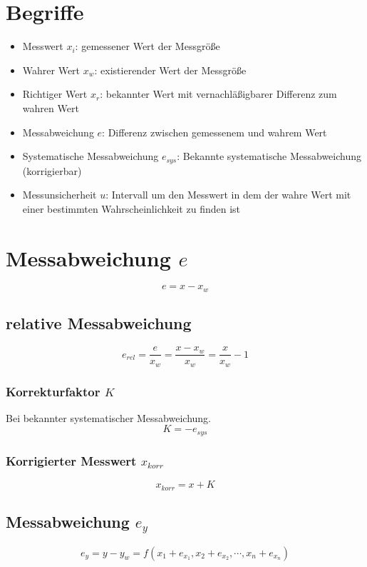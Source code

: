 \section{Begriffe}
\begin{itemize}
  \item Messwert \(x_i\): gemessener Wert der Messgröße
  \item Wahrer Wert \(x_w\): existierender Wert der Messgröße
  \item Richtiger Wert \(x_r\): bekannter Wert mit vernachläßigbarer Differenz
  zum wahren Wert
  \item Messabweichung \(e\): Differenz zwischen gemessenem und wahrem Wert
  \item Systematische Messabweichung \(e_{sys}\): Bekannte systematische
  Messabweichung (korrigierbar)
  \item Messunsicherheit \(u\): Intervall um den Messwert in dem der wahre Wert
  mit einer bestimmten Wahrscheinlichkeit zu finden ist
\end{itemize}

\section{Messabweichung \texorpdfstring{$e$}{}}
\[e=x-x_w\]

\subsection{relative Messabweichung}
\[e_{rel} = \frac{e}{x_w} = \frac{x-x_w}{x_w} = \frac{x}{x_w} - 1\]

\begin{multicols}{2}
\subsubsection*{Korrekturfaktor \texorpdfstring{$K$}{}}
Bei bekannter systematischer Messabweichung.
\[K = -e_{sys}\]

\subsubsection*{Korrigierter Messwert \texorpdfstring{$x_{korr}$}{}}
\[x_{korr} = x + K\]
\end{multicols}

\subsection{Messabweichung \texorpdfstring{$e_y$}{}}
\[e_y = y-y_w = f\left( x_1 + e_{x_1}, x_2 + e_{x_2}, \cdots ,x_n +
e_{x_n}\right)\]

